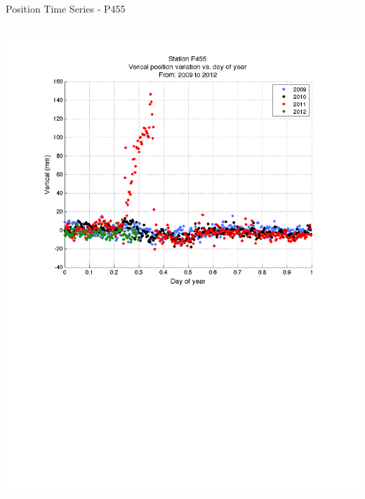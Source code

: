 \documentclass{beamer}
\begin{document}
\begin{frame}{Position Time Series - P455}
\begin{columns}
\includegraphics[width=1\linewidth,trim=70 300 70 50, clip=true]{logan/p455_pos_byYear.pdf}
\end{columns}
\end{frame}
\end{document}

